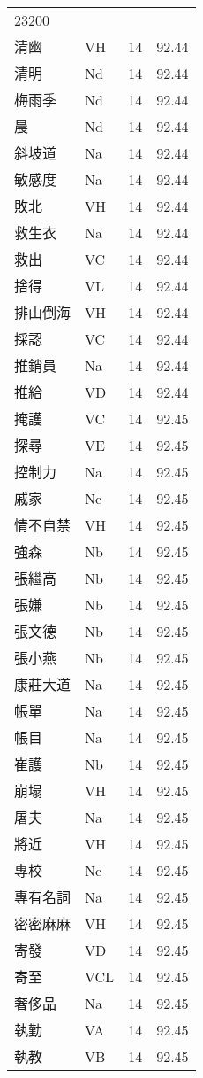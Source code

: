 \documentclass[twocolumn]{book}
\begin{document}
\begin{supertabular}{llrr}
23200\\
清幽 & VH & 14 &  92.44\\
清明 & Nd & 14 &  92.44\\
梅雨季 & Nd & 14 &  92.44\\
晨 & Nd & 14 &  92.44\\
斜坡道 & Na & 14 &  92.44\\
敏感度 & Na & 14 &  92.44\\
敗北 & VH & 14 &  92.44\\
救生衣 & Na & 14 &  92.44\\
救出 & VC & 14 &  92.44\\
捨得 & VL & 14 &  92.44\\
排山倒海 & VH & 14 &  92.44\\
採認 & VC & 14 &  92.44\\
推銷員 & Na & 14 &  92.44\\
推給 & VD & 14 &  92.44\\
掩護 & VC & 14 &  92.45\\
探尋 & VE & 14 &  92.45\\
控制力 & Na & 14 &  92.45\\
戚家 & Nc & 14 &  92.45\\
情不自禁 & VH & 14 &  92.45\\
強森 & Nb & 14 &  92.45\\
張繼高 & Nb & 14 &  92.45\\
張嫌 & Nb & 14 &  92.45\\
張文德 & Nb & 14 &  92.45\\
張小燕 & Nb & 14 &  92.45\\
康莊大道 & Na & 14 &  92.45\\
帳單 & Na & 14 &  92.45\\
帳目 & Na & 14 &  92.45\\
崔護 & Nb & 14 &  92.45\\
崩塌 & VH & 14 &  92.45\\
屠夫 & Na & 14 &  92.45\\
將近 & VH & 14 &  92.45\\
專校 & Nc & 14 &  92.45\\
專有名詞 & Na & 14 &  92.45\\
密密麻麻 & VH & 14 &  92.45\\
寄發 & VD & 14 &  92.45\\
寄至 & VCL & 14 &  92.45\\
奢侈品 & Na & 14 &  92.45\\
執勤 & VA & 14 &  92.45\\
執教 & VB & 14 &  92.45\\

\end{supertabular}
\end{document}
